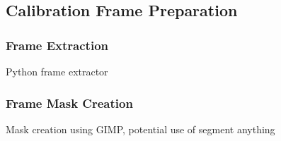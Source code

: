 \subsection{Calibration Frame Preparation}

\subsubsection{Frame Extraction}
Python frame extractor

\subsubsection{Frame Mask Creation}
Mask creation using GIMP, potential use of segment anything